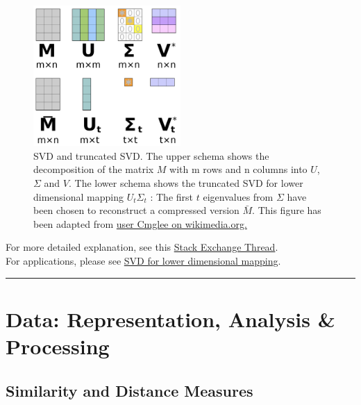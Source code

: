 \documentclass[
]{book}
\begin{document}
\begin{figure}
\centering
\includegraphics[width=0.5\textwidth,height=\textheight]{figures/SVD_lower_dims.png}
\caption{SVD and truncated SVD. The upper schema shows the decomposition of the
matrix \(M\) with m rows and n columns into \(U\), \(\Sigma\) and \(V\). The
lower schema shows the truncated SVD for lower dimensional mapping
\(U_t \Sigma_t\) : The first \(t\) eigenvalues from \(\Sigma\) have been
chosen to reconstruct a compressed version \(\bar{M}\). This figure has
been adapted from \href{https://commons.wikimedia.org/wiki/File:Reduced_Singular_Value_Decompositions.svg}{user Cmglee on
wikimedia.org.}}
\end{figure}

For more detailed explanation, see this \href{https://stats.stackexchange.com/questions/342046/explaining-dimensionality-reduction-using-svd-without-reference-to-pca}{Stack Exchange
Thread}.\\
For applications, please see \protect\hyperlink{SVD2}{SVD for lower dimensional mapping}.

\begin{center}\rule{0.5\linewidth}{0.5pt}\end{center}

\hypertarget{data-representation-analysis-processing}{%
\chapter{Data: Representation, Analysis \& Processing}\label{data-representation-analysis-processing}}

\hypertarget{similarity-and-distance-measures}{%
\section{Similarity and Distance Measures}\label{similarity-and-distance-measures}}
\end{document}
